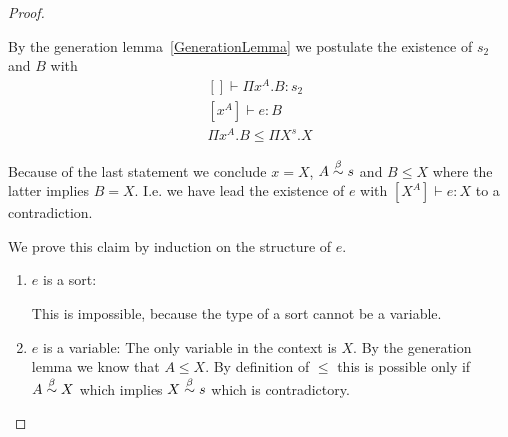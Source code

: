 \begin{theorem}
\begin{proof}
\begin{enumerate}
            By the generation lemma~\ref{GenerationLemma} we postulate the
                existence of $s_2$ and $B$ with
                $$
                \begin{array}{l}
                    [] \vdash \Pi x^A. B: s_2
                    \\
                    \text{$[x^A]$} \vdash e: B
                    \\
                    \Pi x^A. B \le \Pi X^s. X
                \end{array}
                $$

                Because of the last statement we conclude $x = X$, $A \stackrel{\beta}{\sim} s$
                and $B \le X$ where the latter implies $B = X$. I.e. we have
                lead the existence of $e$ with $[X^A] \vdash e: X$ to a
                contradiction.

                We prove this claim by induction on the structure of $e$.
                \begin{enumerate}
                \item $e$ is a sort:

                    This is impossible, because the type of a sort cannot be a
                        variable.

                \item $e$ is a variable: The only variable in the context is
                    $X$. By the generation lemma we know that $A \le X$. By
                        definition of $\le$ this is possible only if $A \stackrel{\beta}{\sim}
                        X$ which implies $X \stackrel{\beta}{\sim} s$ which is contradictory.
                \end{enumerate}
        \end{enumerate}
    \end{proof}
\end{theorem}
